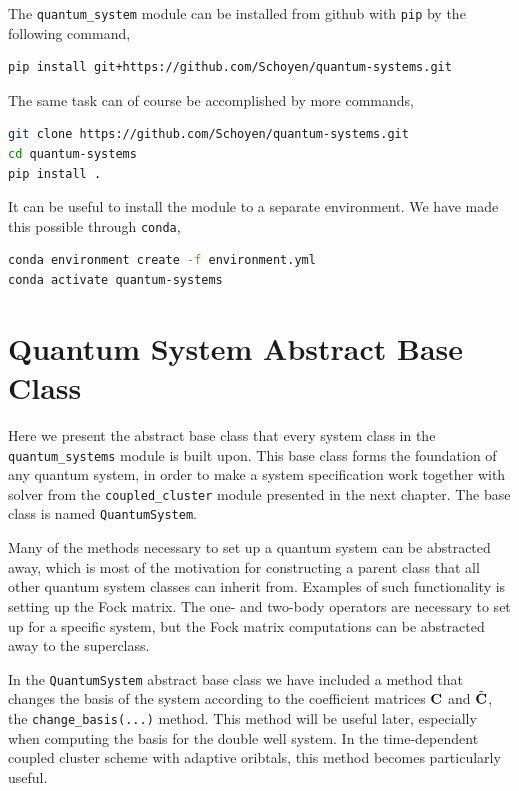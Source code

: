 The \lstinline{quantum_system} module can be installed from github with \lstinline{pip}
by the following command,
\begin{lstlisting}[language=bash]
pip install git+https://github.com/Schoyen/quantum-systems.git
\end{lstlisting}
The same task can of course be accomplished by more commands,
\begin{lstlisting}[language=bash]
git clone https://github.com/Schoyen/quantum-systems.git
cd quantum-systems
pip install .
\end{lstlisting}

It can be useful to install the module to a separate environment. We have made this 
possible through \lstinline{conda},
\begin{lstlisting}[language=bash]
conda environment create -f environment.yml
conda activate quantum-systems    
\end{lstlisting}

\section{Quantum System Abstract Base Class} 

Here we present the abstract base class that every system class in the
\lstinline{quantum_systems} module is built upon. This base class forms the foundation 
of any quantum system, in order to make a system specification work together with 
solver from the \lstinline{coupled_cluster} module presented in the next chapter. The base class is 
named \lstinline{QuantumSystem}.

\begin{figure}[h]

\end{figure}

Many of the methods necessary to set up a quantum system can be abstracted away, which 
is most of the motivation for constructing a parent class that all other 
quantum system classes can inherit from. Examples of such functionality is 
setting up the Fock matrix. The one- and two-body operators are necessary to set up 
for a specific system, but the Fock matrix computations can be abstracted away 
to the superclass.

In the \lstinline{QuantumSystem} abstract base class we have included a
method that changes the basis of the system according to the coefficient matrices 
$\vb{C}$ and $\tilde{\vb{C}}$, the \lstinline{change_basis(...)} method.
This method will be useful later, especially when 
computing the basis for the double well system. In the time-dependent coupled cluster 
scheme with adaptive oribtals, this method becomes particularly useful. 

